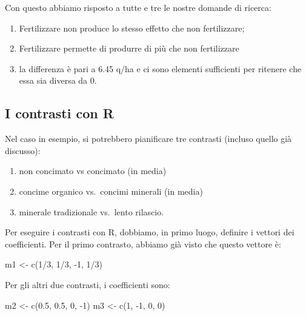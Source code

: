 \documentclass[a4paper,12pt,oneside]{book}
\providecommand{\tightlist}{%
  \setlength{\itemsep}{0pt}\setlength{\parskip}{0pt}}
\newenvironment{Shaded}{}{}
\newcommand{\KeywordTok}[1]{#1}
\newcommand{\DecValTok}[1]{#1}
\newcommand{\FloatTok}[1]{#1}
\newcommand{\StringTok}[1]{#1}
\newcommand{\OperatorTok}[1]{#1}
\newcommand{\NormalTok}[1]{#1}
\begin{document}
Con questo abbiamo risposto a tutte e tre le nostre domande di ricerca:

\begin{enumerate}
\def\labelenumi{\arabic{enumi}.}
\tightlist
\item
  Fertilizzare non produce lo stesso effetto che non fertilizzare;
\item
  Fertilizzare permette di produrre di più che non fertilizzare
\item
  la differenza è pari a 6.45 q/ha e ci sono elementi sufficienti per ritenere che essa sia diversa da 0.
\end{enumerate}

\hypertarget{i-contrasti-con-r}{%
\subsection{I contrasti con R}\label{i-contrasti-con-r}}

Nel caso in esempio, si potrebbero pianificare tre contrasti (incluso quello già discusso):

\begin{enumerate}
\def\labelenumi{\arabic{enumi}.}
\tightlist
\item
  non concimato vs concimato (in media)
\item
  concime organico vs.~concimi minerali (in media)
\item
  minerale tradizionale vs.~lento rilascio.
\end{enumerate}

Per eseguire i contrasti con R, dobbiamo, in primo luogo, definire i vettori dei coefficienti. Per il primo contrasto, abbiamo già visto che questo vettore è:

\begin{Shaded}
\begin{Highlighting}[]
\NormalTok{m1 <-}\StringTok{ }\KeywordTok{c}\NormalTok{(}\DecValTok{1}\OperatorTok{/}\DecValTok{3}\NormalTok{, }\DecValTok{1}\OperatorTok{/}\DecValTok{3}\NormalTok{,  }\DecValTok{-1}\NormalTok{, }\DecValTok{1}\OperatorTok{/}\DecValTok{3}\NormalTok{)}
\end{Highlighting}
\end{Shaded}

Per gli altri due contrasti, i coefficienti sono:

\begin{Shaded}
\begin{Highlighting}[]
\NormalTok{m2 <-}\StringTok{ }\KeywordTok{c}\NormalTok{(}\FloatTok{0.5}\NormalTok{, }\FloatTok{0.5}\NormalTok{, }\DecValTok{0}\NormalTok{, }\DecValTok{-1}\NormalTok{)}
\NormalTok{m3 <-}\StringTok{ }\KeywordTok{c}\NormalTok{(}\DecValTok{1}\NormalTok{, }\DecValTok{-1}\NormalTok{, }\DecValTok{0}\NormalTok{, }\DecValTok{0}\NormalTok{)}
\end{Highlighting}
\end{Shaded}
\end{document}
